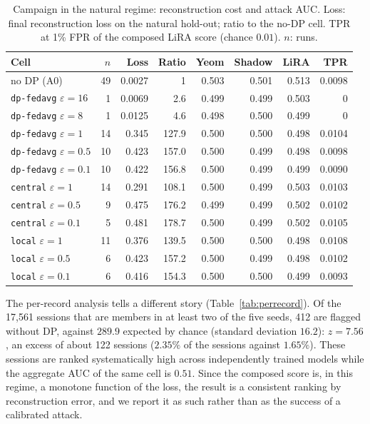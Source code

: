 \begin{table}[t]
\centering
\caption{Campaign in the natural regime: reconstruction cost and attack AUC.
Loss: final reconstruction loss on the natural hold-out; ratio to the no-DP
cell. TPR at 1\% FPR of the composed LiRA score (chance $0.01$). $n$: runs.}
\label{tab:campaign}
\footnotesize
\setlength{\tabcolsep}{3pt}
\begin{tabular}{@{}lrrrrrrr@{}}
\toprule
Cell & $n$ & Loss & Ratio & Yeom & Shadow & LiRA & TPR \\
\midrule
no DP (A0)                 & 49 & 0.0027 & 1     & 0.503 & 0.501 & 0.513 & 0.0098 \\
\midrule
\texttt{dp-fedavg} $\varepsilon{=}16$ & 1 & 0.0069 & 2.6 & 0.499 & 0.499 & 0.503 & 0 \\
\texttt{dp-fedavg} $\varepsilon{=}8$  & 1 & 0.0125 & 4.6 & 0.498 & 0.500 & 0.499 & 0 \\
\texttt{dp-fedavg} $\varepsilon{=}1$  & 14 & 0.345 & 127.9 & 0.500 & 0.500 & 0.498 & 0.0104 \\
\texttt{dp-fedavg} $\varepsilon{=}0.5$ & 10 & 0.423 & 157.0 & 0.500 & 0.499 & 0.498 & 0.0098 \\
\texttt{dp-fedavg} $\varepsilon{=}0.1$ & 10 & 0.422 & 156.8 & 0.500 & 0.499 & 0.499 & 0.0090 \\
\texttt{central} $\varepsilon{=}1$   & 14 & 0.291 & 108.1 & 0.500 & 0.499 & 0.503 & 0.0103 \\
\texttt{central} $\varepsilon{=}0.5$ & 9  & 0.475 & 176.2 & 0.499 & 0.499 & 0.502 & 0.0102 \\
\texttt{central} $\varepsilon{=}0.1$ & 5  & 0.481 & 178.7 & 0.500 & 0.499 & 0.502 & 0.0105 \\
\texttt{local} $\varepsilon{=}1$     & 11 & 0.376 & 139.5 & 0.500 & 0.500 & 0.498 & 0.0108 \\
\texttt{local} $\varepsilon{=}0.5$   & 6  & 0.423 & 157.2 & 0.500 & 0.499 & 0.498 & 0.0102 \\
\texttt{local} $\varepsilon{=}0.1$   & 6  & 0.416 & 154.3 & 0.500 & 0.500 & 0.499 & 0.0093 \\
\bottomrule
\end{tabular}
\end{table}

The per-record analysis tells a different story (Table~\ref{tab:perrecord}).
Of the 17{,}561 sessions that are members in at least two of the five seeds,
412 are flagged without DP, against $289.9$ expected by chance (standard
deviation $16.2$): $z = 7.56$, an excess of about 122 sessions ($2.35\%$ of
the sessions against $1.65\%$). These sessions are ranked systematically high
across independently trained models while the aggregate AUC of the same cell
is $0.51$. Since the composed score is, in this regime, a monotone function of
the loss, the result is a consistent ranking by reconstruction error, and we
report it as such rather than as the success of a calibrated attack.

